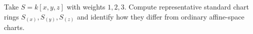 \begin{problem}\label{chal:vi35-03}
Take \(S=k[x,y,z]\) with weights \(1,2,3\). Compute representative standard chart rings \(S_{(x)},S_{(y)},S_{(z)}\) and identify how they differ from ordinary affine-space charts.
\end{problem}
